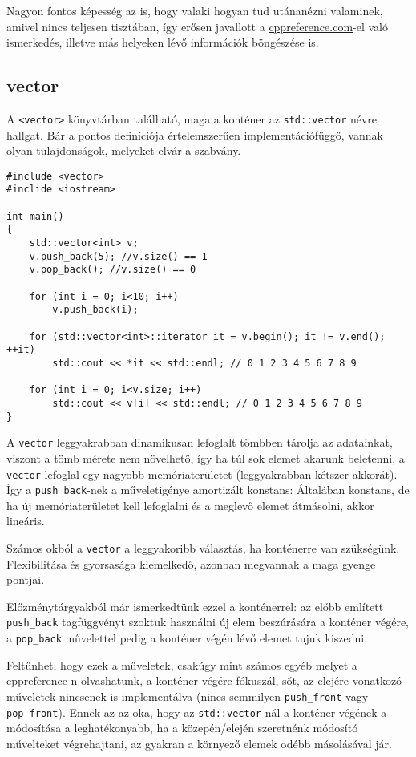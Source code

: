 \documentclass[a4paper,11.5pt,table]{article}
\begin{document}
	\begin{note}
		Nagyon fontos képesség az is, hogy valaki hogyan tud utánanézni valaminek, amivel nincs teljesen tisztában, így erősen javallott a \url{cppreference.com}-el való ismerkedés, illetve más helyeken lévő információk böngészése is.
	\end{note}	
	\subsection{vector}
	A \texttt{<vector>} könyvtárban található, maga a konténer az \texttt{std::vector} névre hallgat. Bár a pontos definíciója értelemszerűen implementációfüggő, vannak olyan tulajdonságok, melyeket elvár a szabvány.
	\smallskip
	\begin{lstlisting}
#include <vector>
#inclide <iostream>

int main()
{
	std::vector<int> v;
	v.push_back(5); //v.size() == 1
	v.pop_back(); //v.size() == 0
	
	for (int i = 0; i<10; i++)
		v.push_back(i);
		
	for (std::vector<int>::iterator it = v.begin(); it != v.end(); ++it)
		std::cout << *it << std::endl; // 0 1 2 3 4 5 6 7 8 9
		
	for (int i = 0; i<v.size; i++)
		std::cout << v[i] << std::endl; // 0 1 2 3 4 5 6 7 8 9
}
	\end{lstlisting}
	A \texttt{vector} leggyakrabban dinamikusan lefoglalt tömbben tárolja az adatainkat, viszont a tömb mérete nem növelhető, így ha túl sok elemet akarunk beletenni, a \texttt{vector} lefoglal egy nagyobb memóriaterületet (leggyakrabban kétszer akkorát). Így a \texttt{push\_back}-nek a műveletigénye amortizált konstans: Általában konstans, de ha új memóriaterületet kell lefoglalni és a meglevő elemet átmásolni, akkor lineáris.
	
	\begin{note}
		Számos okból a \texttt{vector} a leggyakoribb választás, ha konténerre van szükségünk. Flexibilitása és gyorsasága kiemelkedő, azonban megvannak a maga gyenge pontjai.
	\end{note}
	
	\smallskip
	Előzménytárgyakból már ismerkedtünk ezzel a konténerrel: az előbb említett \texttt{push\_back} tagfüggvényt szoktuk használni új elem beszúrására a konténer végére, a \texttt{pop\_back} művelettel pedig a konténer végén lévő elemet tujuk kiszedni. 
	
	Feltűnhet, hogy ezek a műveletek, csakúgy mint számos egyéb melyet a cppreference-n olvashatunk, a konténer végére fókuszál, sőt, az elejére vonatkozó műveletek nincsenek is implementálva (nincs semmilyen \texttt{push\_front} vagy \texttt{pop\_front}). Ennek az az oka, hogy az \texttt{std::vector}-nál a konténer végének a módosítása a leghatékonyabb, ha a közepén/elején szeretnénk módosító művelteket végrehajtani, az gyakran a környező elemek odébb másolásával jár.
\end{document}
